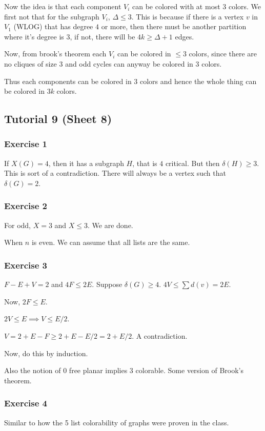 \documentclass[11pt]{article}
\begin{document}
Now the idea is that each component \(V_i\) can be colored with at most \(3\)
colors. We first not that for the subgraph \(V_i\), \(\Delta \le 3\). This is
because if there is a vertex \(v\) in \(V_1\) (WLOG) that has degree \(4\) or
more, then there must be another partition where it's degree is \(3\), if
not, there will be \(4k \ge \Delta + 1\) edges.

Now, from brook's theorem each \(V_i\) can be colored in \(\le 3\) colors,
since there are no cliques of size \(3\) and odd cycles can anyway be colored
in \(3\) colors.

Thus each components can be colored in \(3\) colors and hence the whole thing
can be colored in \(3k\) colors.
\subsection{Tutorial 9 (Sheet 8)}
\label{sec:org7564cef}
\subsubsection{Exercise 1}
\label{sec:org89dd1bc}
If \(X(G) = 4\), then it has a subgraph \(H\), that is \(4\) critical. But then
\(\delta(H) \ge 3\). This is sort of a contradiction. There will always be a
vertex such that \(\delta(G) = 2\).
\subsubsection{Exercise 2}
\label{sec:orgb954eb7}
For odd, \(X = 3\) and \(X \le 3\). We are done.

When \(n\) is even. We can assume that all lists are the same.
\subsubsection{Exercise 3}
\label{sec:org34a29de}
\(F - E + V = 2\) and \(4F \le 2E\). Suppose \(\delta(G) \ge 4\). \(4V \le \sum
    d(v) = 2E\).

Now, \(2F \le E\).

\(2V \le E \implies V \le E/2\).

\(V = 2 + E - F \ge 2 + E - E/2 = 2 + E/2\). A contradiction.

Now, do this by induction.

Also the notion of \(0\) free planar implies \(3\) colorable. Some version of
Brook's theorem.
\subsubsection{Exercise 4}
\label{sec:org162aa32}
Similar to how the 5 list colorability of graphs were proven in the class.
\end{document}
